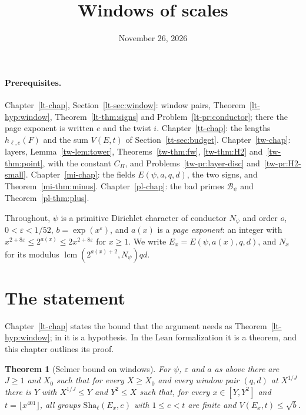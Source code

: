 \documentclass[reqno]{amsart}
\title{Windows of scales}
\author{}
\date{November 26, 2026}
\newcounter{chap}
\theoremstyle{definition}
\theoremstyle{plain}
\newtheorem{theorem}{Theorem}[section]
\theoremstyle{remark}
\newcommand{\Bc}{\mathcal{B}}
\newcommand{\Sha}{\mathrm{Sha}}
\begin{document}
\maketitle
{}\label{chap}

\paragraph{Prerequisites.}
Chapter~\ref{lt-chap}, Section~\ref{lt-sec:window}: window pairs, Theorem~\ref{lt-hyp:window}, Theorem~\ref{lt-thm:signs} and Problem~\ref{lt-pr:conductor}; there the page exponent is written \(e\) and the twist \(i\).  Chapter~\ref{tt-chap}: the lengths \(h_{\ell,e}(F)\) and the sum \(V(E,t)\) of Section~\ref{tt-sec:budget}.  Chapter~\ref{tw-chap}: layers, Lemma~\ref{tw-lem:tower}, Theorems~\ref{tw-thm:fw}, \ref{tw-thm:H2} and~\ref{tw-thm:point}, with the constant \(C_H\), and Problems~\ref{tw-pr:layer-disc} and~\ref{tw-pr:H2-small}.  Chapter~\ref{mi-chap}: the fields \(E(\psi,a,q,d)\), the two signs, and Theorem~\ref{mi-thm:minus}.  Chapter~\ref{pl-chap}: the bad primes \(\Bc_\psi\) and Theorem~\ref{pl-thm:plus}.

Throughout, \(\psi\) is a primitive Dirichlet character of conductor \(N_\psi\) and order \(o\), \(0<\varepsilon<1/52\), \(b=\exp(x^\varepsilon)\), and \(a(x)\) is a \emph{page exponent}: an integer with \(x^{2+8\varepsilon}\le2^{a(x)}\le2x^{2+8\varepsilon}\) for \(x\ge1\).  We write \(E_x=E(\psi,a(x),q,d)\), and \(N_x\) for its modulus \(\operatorname{lcm}(2^{a(x)+2},N_\psi)qd\).

\section{The statement}\label{sec:statement}

Chapter~\ref{lt-chap} states the bound that the argument needs as Theorem~\ref{lt-hyp:window}; in \cite{Adr} it is a hypothesis.  In the Lean formalization it is a theorem, and this chapter outlines its proof.

\begin{theorem}[Selmer bound on windows]\label{thm:vwin}
For \(\psi\), \(\varepsilon\) and \(a\) as above there are \(J\ge1\) and \(X_0\) such that for every \(X\ge X_0\) and every window pair \((q,d)\) at \(X^{1/J}\) there is \(Y\) with \(X^{1/J}\le Y\) and \(Y^2\le X\) such that, for every \(x\in[Y,Y^2]\) and \(t=\lfloor x^{401}\rfloor\), all groups \(\Sha_\ell(E_x,e)\) with \(1\le e<t\) are finite and \(V(E_x,t)\le\sqrt b\).
\end{theorem}
\end{document}
